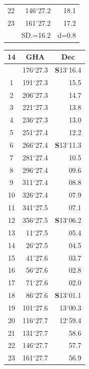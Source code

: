 \documentclass[10pt, a4paper]{report}
\begin{document}
\begin{scriptsize}
\begin{tabular*}{0.2\textwidth}[t]{@{\extracolsep{\fill}}|c|rr|}
22 & 146$^\circ$27.2 & 18.1\\
23 & 161$^\circ$27.2 & 17.2\\
\hline
\rule{0pt}{2.4ex} & \multicolumn{1}{c}{SD.=16.2} & \multicolumn{1}{c|}{d=0.8}\\
\hline
\end{tabular*}\noindent
\begin{tabular*}{0.2\textwidth}[t]{@{\extracolsep{\fill}}|c|rr|}
\hline
\multicolumn{1}{|c|}{\rule{0pt}{2.6ex}\textbf{14}} & \multicolumn{1}{c}{\textbf{GHA}} & \multicolumn{1}{c|}{\textbf{Dec}}\\
\hline\rule{0pt}{2.6ex}\noindent
0 & 176$^\circ$27.3 & \textbf{S}13$^\circ$16.4\\
1 & 191$^\circ$27.3 & 15.5\\
2 & 206$^\circ$27.3 & 14.7\\
3 & 221$^\circ$27.3 & \raisebox{0.24ex}{\boldmath$\cdot$~\boldmath$\cdot$~~}13.8\\
4 & 236$^\circ$27.3 & 13.0\\
5 & 251$^\circ$27.4 & 12.2\\[2Pt]
6 & 266$^\circ$27.4 & \textbf{S}13$^\circ$11.3\\
7 & 281$^\circ$27.4 & 10.5\\
8 & 296$^\circ$27.4 & 09.6\\
9 & 311$^\circ$27.4 & \raisebox{0.24ex}{\boldmath$\cdot$~\boldmath$\cdot$~~}08.8\\
10 & 326$^\circ$27.4 & 07.9\\
11 & 341$^\circ$27.5 & 07.1\\[2Pt]
12 & 356$^\circ$27.5 & \textbf{S}13$^\circ$06.2\\
13 & 11$^\circ$27.5 & 05.4\\
14 & 26$^\circ$27.5 & 04.5\\
15 & 41$^\circ$27.6 & \raisebox{0.24ex}{\boldmath$\cdot$~\boldmath$\cdot$~~}03.7\\
16 & 56$^\circ$27.6 & 02.8\\
17 & 71$^\circ$27.6 & 02.0\\[2Pt]
18 & 86$^\circ$27.6 & \textbf{S}13$^\circ$01.1\\
19 & 101$^\circ$27.6 & 13$^\circ$00.3\\
20 & 116$^\circ$27.7 & 12$^\circ$59.4\\
21 & 131$^\circ$27.7 & \raisebox{0.24ex}{\boldmath$\cdot$~\boldmath$\cdot$~~}58.6\\
22 & 146$^\circ$27.7 & 57.7\\
23 & 161$^\circ$27.7 & 56.9\\

\end{tabular*}
\end{scriptsize}
\end{document}
